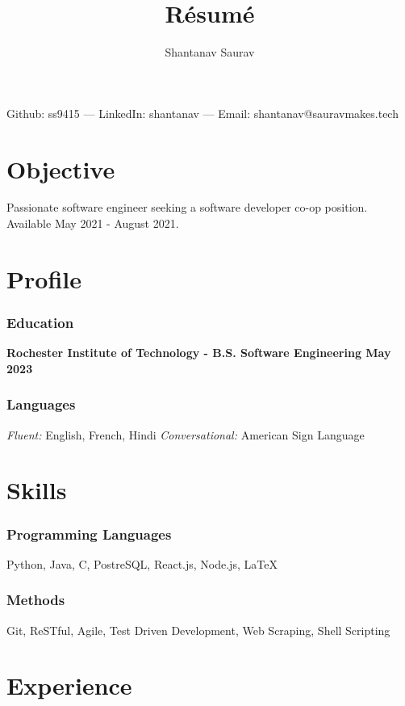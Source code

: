 \documentclass[11pt, letterpaper]{article}
\makeatletter
\renewcommand{\maketitle} {
    \begin{center}    
        {\LARGE\bfseries \theauthor}

        \vspace{.5em}

        Github: ss9415 --- LinkedIn: shantanav --- Email: shantanav@sauravmakes.tech
    \end{center}
    \thispagestyle{empty}
}
\makeatother
\begin{document}
    \title{R\'esum\'e}
    \author{Shantanav Saurav}

    \maketitle

    \section{Objective}
        Passionate software engineer seeking a software developer co-op position. 
        Available May 2021 - August 2021.

    \section{Profile}
        \subsubsection{Education}
            \textbf{Rochester Institute of Technology - B.S. Software Engineering \hfill May 2023}
        \subsubsection{Languages}
            \emph{Fluent:} English, French, Hindi 
            \emph{Conversational:} American Sign Language

    \section{Skills}
        \subsubsection{Programming Languages}
            Python, Java, C, PostreSQL, React.js, Node.js, \LaTeX
        \subsubsection{Methods}
            Git, ReSTful, Agile, Test Driven Development, Web Scraping, Shell Scripting

    \section{Experience}
\end{document}
